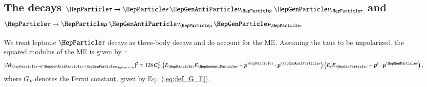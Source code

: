 \subsection{The decays $\Pgt \to \enunu$ and $\Pgt \to \mununu$}
\label{sec:appendix_tauToLepDecays}

We treat leptonic $\Pgt$ decays as three-body decays and do
account for the ME. Assuming the taus to be unpolarized,
the squared modulus of the ME is given by~\cite{Barger:1987nn}:
\begin{equation}
\vert\mathcal{M}_{\Pgt \to \ellnunu} \vert^{2} = 128 \, G^{2}_{F} \,
\left( E_{\Pgt} E_{\APnu} - \bm{p}^{\Pgt} \cdot \bm{p}^{\APnu} \right)
\, \left( E_{\Plepton} E_{\Pnu} - \bm{p}^{\Plepton} \cdot \bm{p}^{\Pnu} \right) \, , 
\label{eq:lepTauDecaysME}
\end{equation}
where $G_{F}$ denotes the Fermi constant, given by Eq.~(\ref{eq:def_G_F}).

